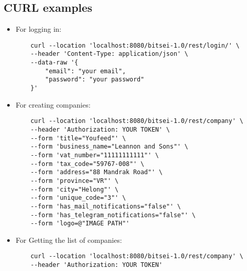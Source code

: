 \newpage
\subsection{CURL examples}
\begin{itemize}
    \item For logging in:
    \begin{lstlisting}
    curl --location 'localhost:8080/bitsei-1.0/rest/login/' \
    --header 'Content-Type: application/json' \
    --data-raw '{
        "email": "your email",
        "password": "your password"
    }'
    \end{lstlisting}
    \item For creating companies:
    \begin{lstlisting}
    curl --location 'localhost:8080/bitsei-1.0/rest/company' \
    --header 'Authorization: YOUR TOKEN' \
    --form 'title="Youfeed"' \
    --form 'business_name="Leannon and Sons"' \
    --form 'vat_number="11111111111"' \
    --form 'tax_code="59767-008"' \
    --form 'address="88 Mandrak Road"' \
    --form 'province="VR"' \
    --form 'city="Helong"' \
    --form 'unique_code="3"' \
    --form 'has_mail_notifications="false"' \
    --form 'has_telegram_notifications="false"' \
    --form 'logo=@"IMAGE PATH"'
    \end{lstlisting}
    \item For Getting the list of companies:
    \begin{lstlisting}
    curl --location 'localhost:8080/bitsei-1.0/rest/company' \
    --header 'Authorization: YOUR TOKEN'
    \end{lstlisting}
\end{itemize}
